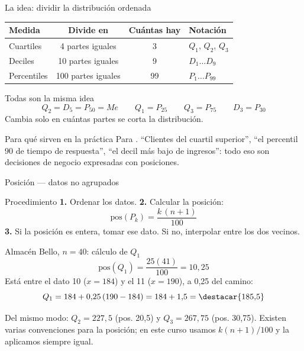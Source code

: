 \documentclass[aspectratio=169,10pt]{beamer}
\begin{document}
\begin{frame}{La idea: dividir la distribución ordenada}
  \footnotesize
  \begin{center}
  \begin{tabular}{@{}lccl@{}}
    \toprule
    \textbf{Medida} & \textbf{Divide en} & \textbf{Cuántas hay} &
    \textbf{Notación} \\
    \midrule
    Cuartiles   & 4 partes iguales  &  3 & $Q_1$, $Q_2$, $Q_3$ \\
    Deciles     & 10 partes iguales &  9 & $D_1 \dots D_9$ \\
    Percentiles & 100 partes iguales & 99 & $P_1 \dots P_{99}$ \\
    \bottomrule
  \end{tabular}
  \end{center}

  \vspace{0.15cm}
  \begin{exampleblock}{Todas son la misma idea}
    \scriptsize
    \[ Q_2 = D_5 = P_{50} = Me \qquad Q_1 = P_{25} \qquad
       Q_3 = P_{75} \qquad D_3 = P_{30} \]
    Cambia solo en cuántas partes se corta la distribución.
  \end{exampleblock}

  \vspace{0.1cm}
  \begin{alertblock}{Para qué sirven en la práctica}
    \scriptsize
    Para . ``Clientes del cuartil superior'',
    ``el percentil 90 de tiempo de respuesta'', ``el decil más bajo de
    ingresos'': todo eso son decisiones de negocio expresadas con posiciones.
  \end{alertblock}
\end{frame}

\begin{frame}{Posición — datos no agrupados}
  \footnotesize
  \begin{block}{Procedimiento}
    \scriptsize
    \textbf{1.} Ordenar los datos. \quad
    \textbf{2.} Calcular la posición:
    \[ \text{pos}(P_k) = \frac{k\,(n+1)}{100} \]
    \textbf{3.} Si la posición es entera, tomar ese dato. Si no, interpolar
    entre los dos vecinos.
  \end{block}

  \vspace{0.1cm}
  \begin{exampleblock}{Almacén Bello, $n = 40$: cálculo de $Q_1$}
    \scriptsize
    \[ \text{pos}(Q_1) = \frac{25(41)}{100} = 10{,}25 \]
    Está entre el dato 10 ($x=184$) y el 11 ($x=190$), a 0,25 del camino:
    \[ Q_1 = 184 + 0{,}25\,(190-184) = 184 + 1{,}5 = \destacar{185{,}5} \]
  \end{exampleblock}

  \vspace{0.05cm}
  {\tiny\color{uniGris} Del mismo modo: $Q_2 = 227{,}5$ (pos. 20,5) y
  $Q_3 = 267{,}75$ (pos. 30,75). Existen varias convenciones para la posición;
  en este curso usamos $k(n+1)/100$ y la aplicamos siempre igual.}
\end{frame}
\end{document}
